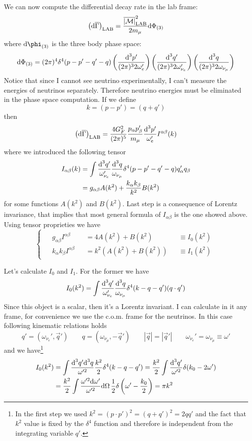 \documentclass[TheoreticalPhy_ModB.tex]{subfiles}
\begin{document}
We can now compute the differential decay rate in the lab frame:
\[\left(\textup{d}\overline\Gamma\right)_{\text{LAB}}
=\frac{\overline{|\mathcal M|}^2_{\text{LAB}}}{2m_\mu}\textup{d}\Phi_{(3)}\]
where $\de\phi_{(3)}$ is the three body phase space:
\[\textup{d}\Phi_{(3)}=(2\pi)^4\delta^4(p-p'-q'-q)
\left(\frac{\textup{d}^3p'}{(2\pi)^32\omega_e'}\right)
\left(\frac{\textup{d}^3q'}{(2\pi)^32\omega_{\nu_e}'}\right)
\left(\frac{\textup{d}^3q}{(2\pi)^32\omega_{\nu_\mu}}\right)
\]
Notice that since I cannot see neutrino experimentally, I can't measure the energies of neutrinos separately. Therefore neutrino energies must be eliminated in the phase space computation.
If we define
\[k=(p-p')=(q+q')\]
then
\[\left(\textup{d}\overline\Gamma\right)_{\text{LAB}}
=\frac{4G_F^2}{(2\pi)^5}\frac{p_\alpha p'_\beta}{m_\mu}\frac{\textup{d}^3p'}{\omega_e'}I^{\alpha\beta}(k)
\]
where we introduced the following tensor
\begin{align*}
I_{\alpha\beta}(k)
&=\int\frac{\textup{d}^3q'}{\omega_{\nu_e}'}\frac{\textup{d}^3q}{\omega_{\nu_\mu}}\delta^4(p-p'-q'-q)q'_\alpha q_\beta\\
&=g_{\alpha\beta}A(k^2)+\frac{k_\alpha k_\beta}{k^2}B(k^2)
\end{align*}
for some functions $A(k^2)$ and $B(k^2)$. Last step is a consequence of Lorentz invariance, that implies that most general formula of $I_{\alpha\beta}$ is the one showed above. Using tensor proprieties we have
\begin{equation}\label{eqn:mu-decay-tensor-dec}
\begin{cases}
\begin{alignedat}{3}
&g_{\alpha\beta}I^{\alpha\beta}&&=4A(k^2)+B(k^2)&&\equiv I_0(k^2)\\
&k_\alpha k_\beta I^{\alpha\beta}&&=k^2(A(k^2)+B(k^2))&&\equiv I_1(k^2)
\end{alignedat}
\end{cases}
\end{equation}

Let's calculate $I_0$ and $I_1$. For the former we have
\[I_0(k^2)=\int\frac{\textup{d}^3q'}{\omega_{\nu_e}'}\frac{\textup{d}^3q}{\omega_{\nu_\mu}}\delta^4(k-q-q')(q\cdot q')\]
Since this object is a scalar, then it's a Lorentz invariant. I can calculate in it any frame, for convenience we use the c.o.m. frame for the neutrinos. In this case following kinematic relations holds
\[q'=(\omega_{\nu_e}', \vec q')
\qquad
q=(\omega_{\nu_\mu},-\vec q')
\qquad
|\vec q|=|\vec q'|
\qquad
\omega_{\nu_e}'=\omega_{\nu_\mu}\equiv\omega'
\]
and we have\footnote{In the first step we used $k^2=(p\cdot p')^2=(q+q')^2=2qq'$ and the fact that $k^2$ value is fixed by the $\delta^4$ function and therefore is independent from the integrating variable $q'$.}
\begin{align*}
I_0(k^2)&=
\int\frac{\textup{d}^3q'\textup{d}^3q}{\omega'^2}\frac{k^2}2\delta^4(k-q-q')
=\frac{k^2}2\int\frac{\textup{d}^3q'}{\omega'^2}\delta(k_0-2\omega')\\
&=\frac{k^2}2\int\frac{\omega'^2\textup{d}\omega'}{\omega'^2}\textup{d}\Omega\,\frac12\delta\left(\omega'-\frac{k_0}2\right)
=\pi k^2
\end{align*}
\end{document}
